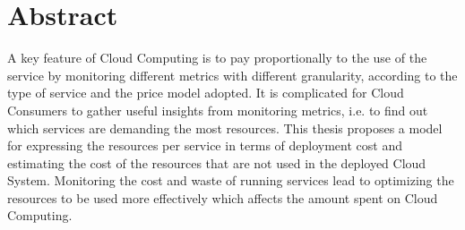 \begingroup
\let\clearpage\relax
\let\cleardoublepage\relax
\let\cleardoublepage\relax

\chapter*{Abstract}
A key feature of Cloud Computing is to pay proportionally to the use of the service by monitoring different metrics with different granularity, according to the type of service and the price model adopted.
It is complicated for Cloud Consumers to gather useful insights from monitoring metrics, i.e. to find out which services are demanding the most resources.
This thesis proposes a model for expressing the resources per service in terms of deployment cost and estimating the cost of the resources that are not used in the deployed Cloud System.
Monitoring the cost and waste of running services lead to  optimizing the resources to be used more effectively which affects the amount spent on Cloud Computing.
\vfill


\endgroup

\vfill
